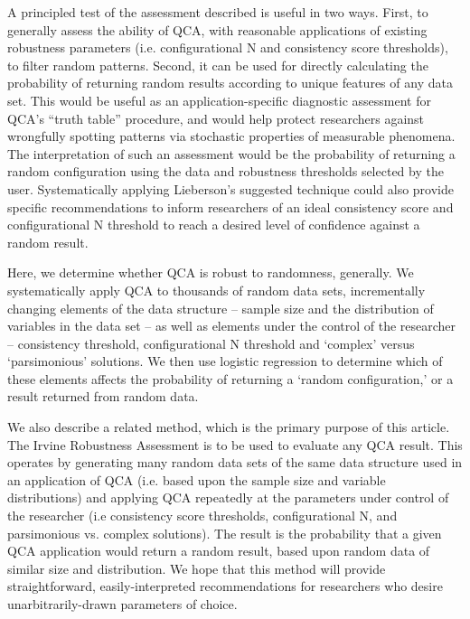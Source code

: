 \documentclass[]{article}
\begin{document}
{%

A principled test of the assessment \citet{lieberson_2004} described is useful in two ways. First, to generally assess the ability of QCA, with reasonable applications of existing robustness parameters (i.e. configurational N and consistency score thresholds), to filter random patterns. Second, it can be used for directly calculating the probability of returning random results according to unique features of any data set. This would be useful as an application-specific diagnostic assessment for QCA's ``truth table'' procedure, and would help protect researchers against wrongfully spotting patterns via stochastic properties of measurable phenomena. The interpretation of such an assessment would be the probability of returning a random configuration using the data and robustness thresholds selected by the user. Systematically applying Lieberson's suggested technique could also provide specific recommendations to inform researchers of an ideal consistency score and configurational N threshold to reach a desired level of confidence against a random result. 


Here, we determine whether QCA is robust to randomness, generally. We systematically apply QCA to thousands of random data sets, incrementally changing elements of the data structure -- sample size and the distribution of variables in the data set -- as well as elements under the control of the researcher -- consistency threshold, configurational N threshold and `complex' versus `parsimonious' solutions. We then use logistic regression to determine which of these elements affects the probability of returning a `random configuration,' or a result returned from random data. 

We also describe a related method, which is the primary purpose of this article. The Irvine Robustness Assessment is to be used to evaluate any QCA result. This operates by generating many random data sets of the same data structure used in an application of QCA (i.e. based upon the sample size and variable distributions) and applying QCA repeatedly at the parameters under control of the researcher (i.e consistency score thresholds, configurational N, and parsimonious vs. complex solutions). The result is the probability that a given QCA application would return a random result, based upon random data of similar size and distribution. We hope that this method will provide straightforward, easily-interpreted recommendations for researchers who desire unarbitrarily-drawn parameters of choice. 


}
\end{document}
